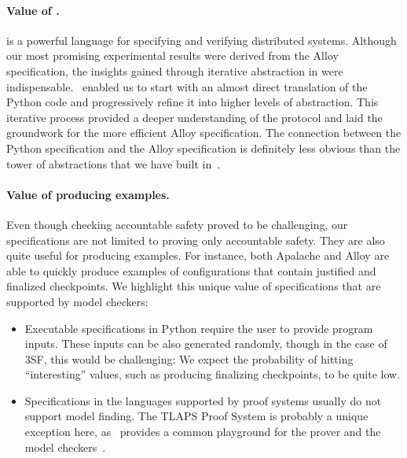 \paragraph{Value of \tlap{}.} \tlap{} is a powerful language for specifying and
verifying distributed systems. Although our most promising experimental results
were derived from the Alloy specification, the insights gained through
iterative abstraction in \tlap{} were indispensable.\ \tlap{} enabled us to
start with an almost direct translation of the Python code and progressively
refine it into higher levels of abstraction. This iterative process provided a
deeper understanding of the protocol and laid the groundwork for the more
efficient Alloy specification. The connection between the Python specification
and the Alloy specification is definitely less obvious than the tower of
abstractions that we have built in~\tlap{}.

\paragraph{Value of producing examples.} Even though checking accountable
safety proved to be challenging, our specifications are not limited to proving
only accountable safety. They are also quite useful for producing examples. For
instance, both Apalache and Alloy are able to quickly produce examples of
configurations that contain justified and finalized checkpoints. We highlight
this unique value of specifications that are supported by model checkers:

\begin{itemize}

  \item Executable specifications in Python require the user to provide program
    inputs. These inputs can be also generated randomly, though in the case of
    3SF, this would be challenging: We expect the probability of hitting
    ``interesting'' values, such as producing finalizing checkpoints, to be
    quite low.

  \item Specifications in the languages supported by proof systems usually do
    not support model finding. The TLAPS Proof System is probably a unique
    exception here, as~\tlap{} provides a common playground for the prover and the
    model checkers~\cite{KonnovKM22}.

\end{itemize}

